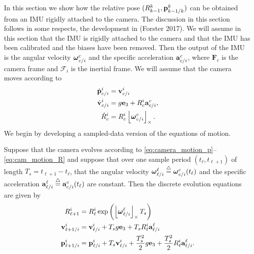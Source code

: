 In this section we show how the relative pose $(R_{k-1}^k, \mathbf{p}_{k-1/k}^k)$ can be obtained from an IMU rigidly attached to the camera.  The discussion in this section follows in some respects, the development in (Forster 2017)\cite{ForsterCarloneDellaert17}.  
We will assume in this section that the IMU is rigidly attached to the camera and that the IMU has been calibrated and the biases have been removed.  Then the output of the IMU is the 
angular velocity $\boldsymbol{\omega}_{c/i}^c$ and the specific acceleration $\mathbf{a}_{c/i}^c$, 
where $\mathbf{F}_c$ is the camera frame and $\mathcal{F}_i$ is the inertial frame. 
We will assume that the camera moves according to 
\begin{align}
\dot{\pbf}_{c/i}^i &= \vbf_{c/i}^i  \label{eq:camera_motion_p} \\
\dot{\vbf}_{c/i}^i &= g \ebf_3 + R_c^i\abf_{c/i}^c, \label{eq:camera_motion_v} \\
\dot{R}_c^i &= R_c^i \ss{\omegabf_{c/i}^c}. \label{eq:camera_motion_R}
\end{align}
We begin by developing a sampled-data version of the equations of motion.
\begin{lemma}
	Suppose that the camera evolves according to \eqref{eq:camera_motion_p}--\eqref{eq:cam_motion_R} and suppose that over one sample period $(t_\ell, t_{\ell+1})$ of length $T_s=t_{\ell+1}-t_\ell$, that the angular velocity $\boldsymbol{\omega}_{\ell/i}^{\ell}\stackrel{\triangle}{=}\boldsymbol{\omega}_{c/i}^c(t_\ell)$ and the specific acceleration $\mathbf{a}_{\ell/i}^{\ell}\stackrel{\triangle}{=} \mathbf{a}_{c/i}^c(t_\ell)$ are constant.  Then the discrete evolution equations are given by
	\begin{align}
	R_{\ell+1}^i &= R_{\ell}^i \exp\left(\ss{\omegabf_{\ell/i}^{\ell}} T_s \right)
	\label{eq:R_imu_int_1} \\
	\vbf_{\ell+1/i}^{i} &= \vbf_{\ell/i}^{i} + T_s g \ebf_3 + T_s R_{\ell}^i \abf_{\ell/i}^{\ell} \label{eq:v_imu_int_1} \\
	\pbf_{\ell+1/i}^{i} &= \pbf_{\ell/i}^{i} + T_s\vbf_{\ell/i}^i + \frac{T_s^2}{2} g\ebf_3 + \frac{T_s^2}{2} R_{\ell}^i \abf_{\ell/i}^{\ell} \label{eq:p_imu_int_1}.
	\end{align}
\end{lemma}
